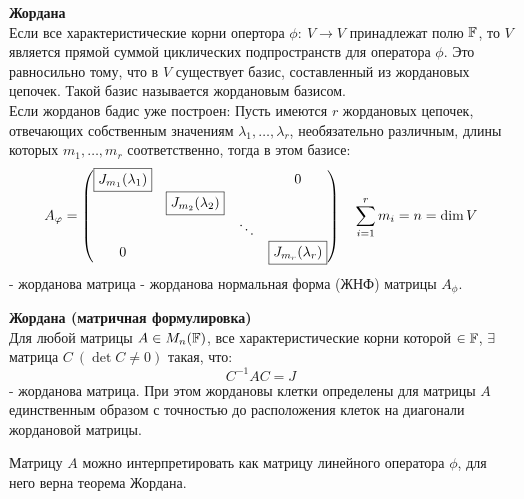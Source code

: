     \begin{theorem} \textbf{Жордана} \\
        \tab[0.5cm]Если все характеристические корни опертора $\phi: \ V \to V$ принадлежат полю $\mathbb{F}$, то $V$ является прямой суммой циклических подпространств для оператора $\phi$. Это равносильно тому, что в $V$ существует базис, составленный из жордановых цепочек. Такой базис называется жордановым базисом.\\
        \tab[0.5cm]Если жорданов бадис уже построен: Пусть имеются $r$ жордановых цепочек, отвечающих собственным значениям $\lambda_1, \ldots, \lambda_r$, необязательно различным, длины которых $m_1,\ldots,m_r$ соответственно, тогда в этом базисе:
        $$A_{\phi} = \begin{pmatrix}
        \text{\fbox{$J_{m_1}(\lambda_1)$}} & \null & \null & 0 \\
        \null & \text{\fbox{$J_{m_2}(\lambda_2)$}}\\
        \null & \null & \ddots\\
        0 & \null & \null & \text{\fbox{$J_{m_r}(\lambda_r)$}}\\
        \end{pmatrix} \ \ \ \sum \limits_{i=1}^rm_i = n = \dim V$$ 
        - жорданова матрица - жорданова нормальная форма (ЖНФ) матрицы $A_{\phi}$.
    \end{theorem}
    \begin{theorem}\textbf{Жордана (матричная формулировка)} \\
        Для любой матрицы $A \in M_n(\mathbb{F})$, все характеристические корни которой $\in \mathbb{F}$, $\exists$ матрица $C \ (\det C \neq 0)$ такая, что: 
        $$C^{-1}AC = J$$
        - жорданова матрица. При этом жордановы клетки определены для матрицы $A$ единственным образом с точностью до расположения клеток на диагонали жордановой матрицы.  
    \end{theorem}
    \begin{remark}
        Матрицу $A$ можно интерпретировать как матрицу линейного оператора $\phi$, для него верна теорема Жордана.  
    \end{remark}
